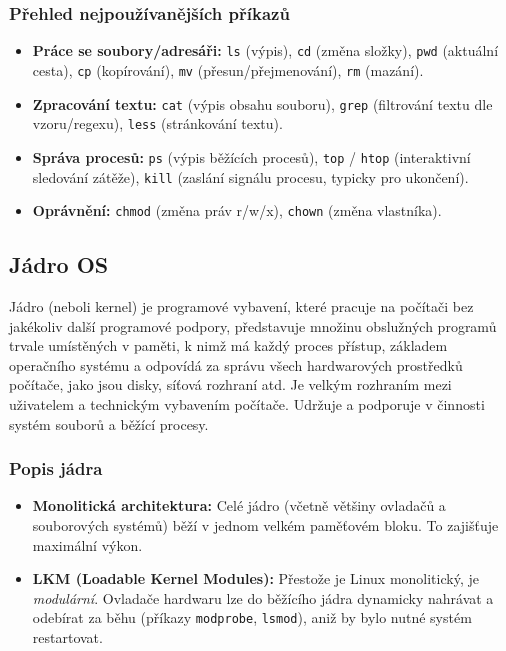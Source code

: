 \subsubsection*{Přehled nejpoužívanějších příkazů}
\begin{itemize}
    \item \textbf{Práce se soubory/adresáři:} \texttt{ls} (výpis), \texttt{cd} (změna složky), \texttt{pwd} (aktuální cesta), \texttt{cp} (kopírování), \texttt{mv} (přesun/přejmenování), \texttt{rm} (mazání).
    \item \textbf{Zpracování textu:} \texttt{cat} (výpis obsahu souboru), \texttt{grep} (filtrování textu dle vzoru/regexu), \texttt{less} (stránkování textu).
    \item \textbf{Správa procesů:} \texttt{ps} (výpis běžících procesů), \texttt{top} / \texttt{htop} (interaktivní sledování zátěže), \texttt{kill} (zaslání signálu procesu, typicky pro ukončení).
    \item \textbf{Oprávnění:} \texttt{chmod} (změna práv r/w/x), \texttt{chown} (změna vlastníka).
\end{itemize}

\subsection{Jádro OS}
Jádro (neboli kernel) je programové vybavení, které pracuje
na počítači bez jakékoliv další programové podpory, představuje množinu obslužných programů trvale
umístěných v paměti, k nimž má každý proces přístup,
základem operačního systému a odpovídá za správu všech hardwarových prostředků počítače, jako jsou disky, síťová
rozhraní atd.
Je velkým rozhraním mezi uživatelem a technickým
vybavením počítače.
Udržuje a podporuje v činnosti systém souborů a běžící
procesy.
\subsubsection*{Popis jádra}
\begin{itemize}
    \item \textbf{Monolitická architektura:} Celé jádro (včetně většiny ovladačů a souborových systémů) běží v jednom velkém paměťovém bloku. To zajišťuje maximální výkon.
    \item \textbf{LKM (Loadable Kernel Modules):} Přestože je Linux monolitický, je \textit{modulární}. Ovladače hardwaru lze do běžícího jádra dynamicky nahrávat a odebírat za běhu (příkazy \texttt{modprobe}, \texttt{lsmod}), aniž by bylo nutné systém restartovat.
\end{itemize}

